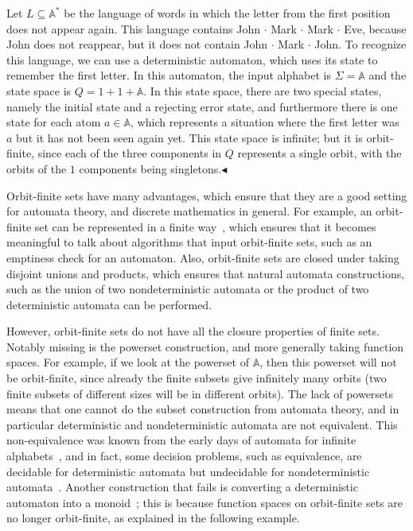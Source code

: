 \documentclass[10pt,a4paper]{amsart}
\numberwithin{equation}{section}
\theoremstyle{plain}
\newcommand{\atoms}{\mathbb A}
\newcommand{\exampleend}{$\blacktriangleleft$}
\begin{document}
\begin{example}\label{ex:first-letter-repeats}
    Let  $L \subseteq \atoms^*$ be the language of  words in which the letter from the first position does not appear again. This language contains John $\cdot$ Mark $\cdot$ Mark $\cdot$ Eve, because John does not reappear, but it does not contain John $\cdot$ Mark $\cdot$ John. To recognize this language, we can use a deterministic automaton, which uses its state to remember the first letter. In this automaton, the input alphabet is $\Sigma = \atoms$ and  the state space is $Q = 1 + 1 + \atoms$. In this state space, there are two special states, namely the initial state and a rejecting error state, and furthermore there is one state for each atom $a \in \atoms$, which represents a situation where the first letter was $a$ but it has not been seen again yet. This state space is infinite; but it is orbit-finite, since each of the three components in $Q$ represents a single orbit, with the orbits of the $1$ components being singletons.\exampleend
\end{example}

Orbit-finite sets have many advantages, which ensure that they are a good setting for automata theory, and discrete mathematics in general. For example, an orbit-finite set can be represented in a finite way~\cite{bojanczyk_slightly2018}, which ensures that it becomes meaningful to talk about algorithms that input orbit-finite sets, such as an emptiness check for an automaton. Also, orbit-finite sets are closed under taking disjoint unions and products, which ensures that natural automata constructions, such as the union of two nondeterministic automata or the product of two deterministic automata can be performed.

However, orbit-finite sets do not have all the closure properties of finite sets. Notably missing is the powerset construction, and more generally taking function spaces. For example, if we look at the powerset of $\atoms$, then this powerset will not be orbit-finite, since already the finite subsets give infinitely many orbits (two finite subsets of different sizes will be in different orbits). The lack of powersets means that one cannot do the subset construction from automata theory, and in particular deterministic and nondeterministic automata are not equivalent. This non-equivalence was known from the early days of automata for infinite alphabets~\cite{kaminskiFiniteMemoryAutomata1994}, and in fact, some decision problems, such as equivalence, are decidable for deterministic automata but undecidable for nondeterministic automata~\cite{nevenFiniteStateMachines2004}. Another construction that fails is converting a deterministic automaton into a monoid~\cite[p.~221]{bojanczykNominalMonoids2013}; this is because function spaces on orbit-finite sets are no longer orbit-finite, as explained in the following example. 
\end{document}
